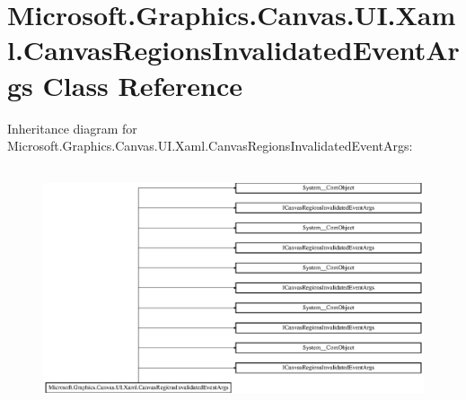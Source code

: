 \hypertarget{class_microsoft_1_1_graphics_1_1_canvas_1_1_u_i_1_1_xaml_1_1_canvas_regions_invalidated_event_args}{}\section{Microsoft.\+Graphics.\+Canvas.\+U\+I.\+Xaml.\+Canvas\+Regions\+Invalidated\+Event\+Args Class Reference}
\label{class_microsoft_1_1_graphics_1_1_canvas_1_1_u_i_1_1_xaml_1_1_canvas_regions_invalidated_event_args}
Inheritance diagram for Microsoft.\+Graphics.\+Canvas.\+U\+I.\+Xaml.\+Canvas\+Regions\+Invalidated\+Event\+Args\+:\begin{figure}[H]
\begin{center}
\leavevmode
\includegraphics[height=7.096774cm]{class_microsoft_1_1_graphics_1_1_canvas_1_1_u_i_1_1_xaml_1_1_canvas_regions_invalidated_event_args}
\end{center}
\end{figure}
